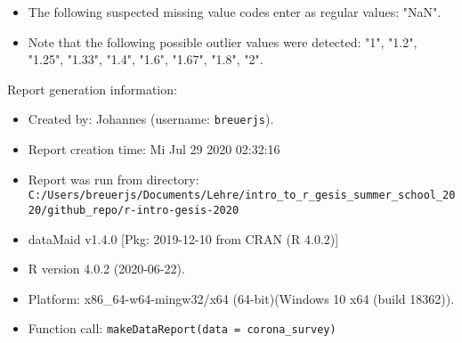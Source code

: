 \documentclass[
]{report}
\begin{document}
\begin{itemize}
\item
  The following suspected missing value codes enter as regular values:
  "NaN".
\item
  Note that the following possible outlier values were detected: "1",
  "1.2", "1.25", "1.33", "1.4", "1.6", "1.67", "1.8", "2".
\end{itemize}

\noindent\makebox[\linewidth]{\rule{\textwidth}{0.4pt}}

Report generation information:

\begin{itemize}
\item
  Created by: Johannes (username: \texttt{breuerjs}).
\item
  Report creation time: Mi Jul 29 2020 02:32:16
\item
  Report was run from directory:
  \texttt{C:/Users/breuerjs/Documents/Lehre/intro\_to\_r\_gesis\_summer\_school\_2020/github\_repo/r-intro-gesis-2020}
\item
  dataMaid v1.4.0 {[}Pkg: 2019-12-10 from CRAN (R 4.0.2){]}
\item
  R version 4.0.2 (2020-06-22).
\item
  Platform: x86\_64-w64-mingw32/x64 (64-bit)(Windows 10 x64 (build
  18362)).
\item
  Function call: \texttt{makeDataReport(data\ =\ corona\_survey)}
\end{itemize}
\end{document}
